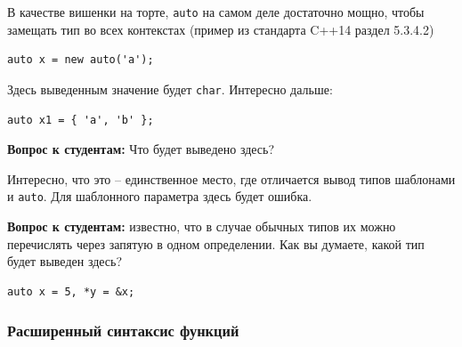 \documentclass[a4paper,12pt,oneside]{article}
\newif\ifanswers
\begin{document}
В качестве вишенки на торте, \lstinline!auto! на самом деле достаточно мощно, чтобы замещать тип во всех контекстах (пример из стандарта C++14 раздел 5.3.4.2)

\begin{lstlisting}
auto x = new auto('a');
\end{lstlisting}

Здесь выведенным значение будет \lstinline!char!. Интересно дальше:

\begin{lstlisting}
auto x1 = { 'a', 'b' };
\end{lstlisting}

\textbf{Вопрос к студентам:} Что будет выведено здесь? 

\ifanswers
Это довольно хитрый вопрос. Ответ ``массив'' неверный. В реальности будет выведен \lstinline!std::initializer_list<char>! -- тот самый новый тип, который позволил так лихо инициализировать вектор в самом начале.
\fi

Интересно, что это -- единственное место, где отличается вывод типов шаблонами и \lstinline!auto!. Для шаблонного параметра здесь будет ошибка.

\textbf{Вопрос к студентам:} известно, что в случае обычных типов их можно перечислять через запятую в одном определении. Как вы думаете, какой тип будет выведен здесь?

\begin{lstlisting}
auto x = 5, *y = &x;
\end{lstlisting}

\ifanswers
Вопрос несколько более простодушен. Правильный ответ: увы, это ошибка. Это, правда, создает некоторые проблемы. Неясно почему вот так можно:

\begin{lstlisting}
auto x = 1; 
auto y = 1.0;
\end{lstlisting}

А вот так нельзя:

\begin{lstlisting}
auto x = 1, y = 1.0; /* ! */
\end{lstlisting}

Написано-то как бы одно и то же. Ждем исправления этого в C++17 или более поздних. С другой стороны, жить это не мешает.
\fi

\subsubsection{Расширенный синтаксис функций}\label{DeclFunctions}
\end{document}
